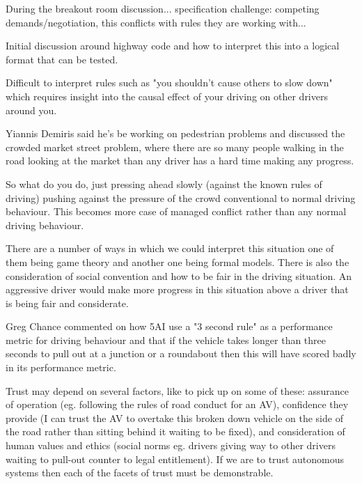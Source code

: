 \documentclass[sigconf]{acmart}
\begin{document}
During the breakout room discussion... specification challenge: competing demands/negotiation, this conflicts with rules they are working with...

Initial discussion around highway code and how to interpret this into a logical format that can be tested.

Difficult to interpret rules such as "you shouldn't cause others to slow down" which requires insight into the causal effect of your driving on other drivers around you.

Yiannis Demiris said he's be working on pedestrian problems and discussed the crowded market street problem, where there are so many people walking in the road looking at the market than any driver has a hard time making any progress.

So what do you do, just pressing ahead slowly (against the known rules of driving) pushing against the pressure of the crowd conventional to normal driving behaviour. This becomes more case of managed conflict rather than any normal driving behaviour. 

There are a number of ways in which we could interpret this situation one of them being game theory and another one being formal models. There is also the consideration of social convention and how to be fair in the driving situation. An aggressive driver would make more progress in this situation above a driver that is being fair and considerate.

Greg Chance commented on how 5AI use a "3 second rule" as a performance metric for driving behaviour and that if the vehicle takes longer than three seconds to pull out at a junction or a roundabout then this will have scored badly in its performance metric.

Trust may depend on several factors, like to pick up on some of these: assurance of operation (eg. following the rules of road conduct for an AV), confidence they provide (I can trust the AV to overtake this broken down vehicle on the side of the road rather than sitting behind it waiting to be fixed), and consideration of human values and ethics (social norms eg. drivers giving way to other drivers waiting to pull-out counter to legal entitlement). 
%
If we are to trust autonomous systems then each of the facets of trust must be demonstrable. 
\end{document}
